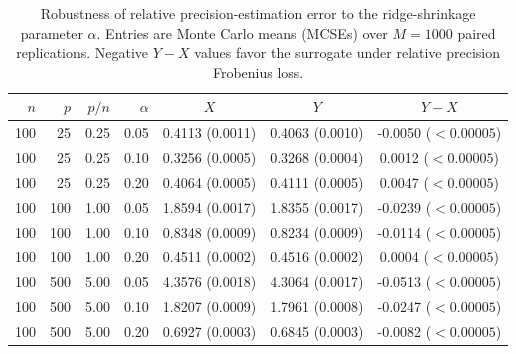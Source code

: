 \begin{table}[htbp]
\centering
\small
\caption{Robustness of relative precision-estimation error to the ridge-shrinkage parameter $\alpha$. Entries are Monte Carlo means (MCSEs) over $M=1000$ paired replications. Negative $Y-X$ values favor the surrogate under relative precision Frobenius loss.}
\label{tab:ridge_alpha_robustness}
\begin{tabular}{rrrrccc}
\hline\hline
\textbf{$n$} & \textbf{$p$} & \textbf{$p/n$} & 
\textbf{$\alpha$} & \textbf{$X$} & \textbf{$Y$} & 
\textbf{$Y-X$} \\
\hline
100 & 25 & 0.25 & 0.05 & 0.4113 (0.0011) & 0.4063 (0.0010) & -0.0050 ($<0.00005$) \\
100 & 25 & 0.25 & 0.10 & 0.3256 (0.0005) & 0.3268 (0.0004) & 0.0012 ($<0.00005$) \\
100 & 25 & 0.25 & 0.20 & 0.4064 (0.0005) & 0.4111 (0.0005) & 0.0047 ($<0.00005$) \\
100 & 100 & 1.00 & 0.05 & 1.8594 (0.0017) & 1.8355 (0.0017) & -0.0239 ($<0.00005$) \\
100 & 100 & 1.00 & 0.10 & 0.8348 (0.0009) & 0.8234 (0.0009) & -0.0114 ($<0.00005$) \\
100 & 100 & 1.00 & 0.20 & 0.4511 (0.0002) & 0.4516 (0.0002) & 0.0004 ($<0.00005$) \\
100 & 500 & 5.00 & 0.05 & 4.3576 (0.0018) & 4.3064 (0.0017) & -0.0513 ($<0.00005$) \\
100 & 500 & 5.00 & 0.10 & 1.8207 (0.0009) & 1.7961 (0.0008) & -0.0247 ($<0.00005$) \\
100 & 500 & 5.00 & 0.20 & 0.6927 (0.0003) & 0.6845 (0.0003) & -0.0082 ($<0.00005$) \\
\hline\hline
\end{tabular}
\end{table}
